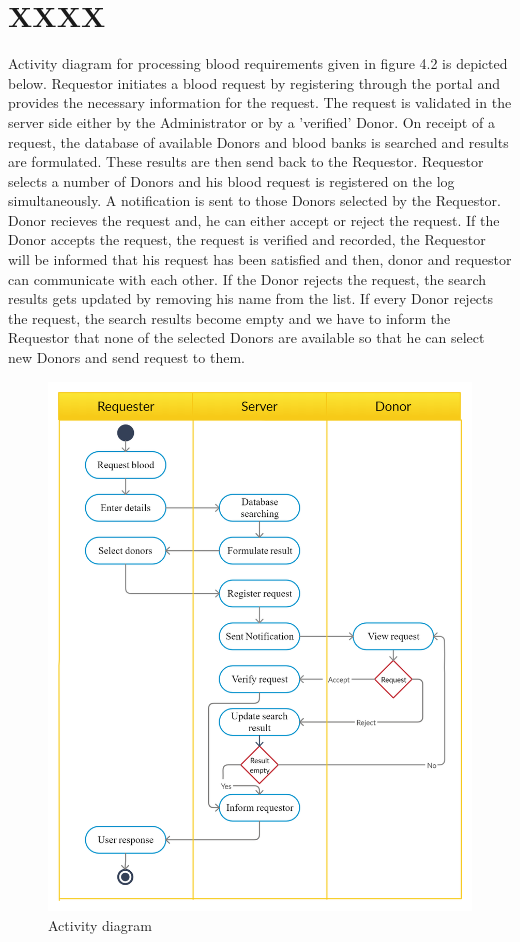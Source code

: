 \section{XXXX}
Activity diagram for processing blood requirements given in figure 4.2 is depicted  below. Requestor initiates a blood request by registering through the portal and provides the necessary information for the request. The request is validated in the server side either by the Administrator or by a 'verified' Donor. On receipt of a request, the database of available Donors and blood banks is searched and results are formulated. These results are then send back to the Requestor. Requestor selects a number of Donors and his blood request is registered on the log simultaneously. A notification is sent to those Donors selected by the Requestor. Donor recieves the request and, he can either accept or reject the request. If the Donor accepts the request, the request is verified and recorded, the Requestor will be informed that his request has been satisfied and then, donor and requestor can communicate with each other. If the Donor rejects the request, the search results gets updated by removing his name from the list. If every Donor rejects the request, the search results become empty and we have to inform the Requestor that none of the selected Donors are available so that he can select new Donors and send request to them. 
\begin{figure}
    \centering
    \includegraphics[width=\textwidth]{Activity.jpg}
    \caption{Activity diagram}
\end{figure}

